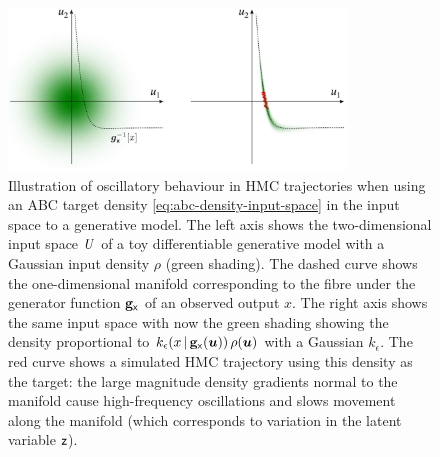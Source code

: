 \begin{figure}[!t]
\centering
\includegraphics[width=0.8\textwidth]{images/gaussian-abc-with-hmc-trajectory-gray}
\caption[Oscillatory Hamiltonian trajectory example.]{Illustration of oscillatory behaviour in \ac{HMC} trajectories when using an \ac{ABC}     target density \eqref{eq:abc-density-input-space} in the input space to a generative model. The left axis shows the two-dimensional input space $\mathit{U}$ of a toy differentiable generative model with a Gaussian input density $\rho$ (green shading). The dashed curve shows the one-dimensional manifold corresponding to the fibre under the generator function ${\mathbf{g}}_{\mathsf{x}}$ of an observed output $x$. The right axis shows the same input space with now the green shading showing the density proportional to $k_\epsilon\lpa x\gvn \genfunc_{\rvar{x}}(\vct{u})\rpa \,\rho(\vct{u})$ with a Gaussian $k_\epsilon$. The red curve shows a simulated \ac{HMC} trajectory using this density as the target: the large magnitude density gradients normal to the manifold cause high-frequency oscillations and slows movement along the manifold (which corresponds to variation in the latent variable $\mathsf{z}$).}
\label{fig:gaussian-abc-hmc-trajectory-example}
\end{figure} 

